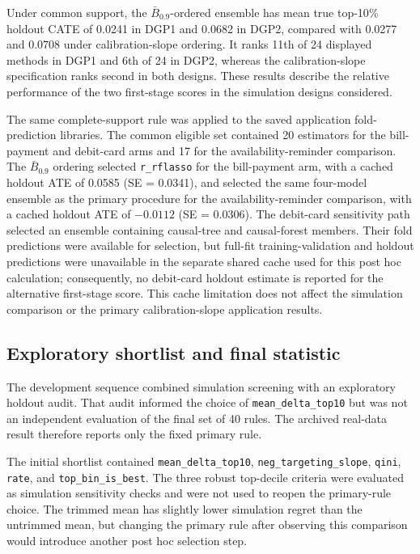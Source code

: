 \documentclass[12pt]{article}
\newcommand{\TargetFrac}{10{\%}\xspace}
\begin{document}


Under common support, the $\bar B_{0.9}$-ordered ensemble has mean true top-\TargetFrac holdout CATE of 0.0241 in DGP1 and 0.0682 in DGP2, compared with 0.0277 and 0.0708 under calibration-slope ordering. It ranks 11th of 24 displayed methods in DGP1 and 6th of 24 in DGP2, whereas the calibration-slope specification ranks second in both designs. These results describe the relative performance of the two first-stage scores in the simulation designs considered.

The same complete-support rule was applied to the saved application fold-prediction libraries. The common eligible set contained 20 estimators for the bill-payment and debit-card arms and 17 for the availability-reminder comparison. The $\bar B_{0.9}$ ordering selected \texttt{r\_rflasso} for the bill-payment arm, with a cached holdout ATE of 0.0585 (SE = 0.0341), and selected the same four-model ensemble as the primary procedure for the availability-reminder comparison, with a cached holdout ATE of $-0.0112$ (SE = 0.0306). The debit-card sensitivity path selected an ensemble containing causal-tree and causal-forest members. Their fold predictions were available for selection, but full-fit training-validation and holdout predictions were unavailable in the separate shared cache used for this post hoc calculation; consequently, no debit-card holdout estimate is reported for the alternative first-stage score. This cache limitation does not affect the simulation comparison or the primary calibration-slope application results.





\subsection{Exploratory shortlist and final statistic}
\label{supp:screening}

The development sequence combined simulation screening with an exploratory holdout audit. That audit informed the choice of \texttt{mean\_delta\_top10} but was not an independent evaluation of the final set of 40 rules. The archived real-data result therefore reports only the fixed primary rule.

The initial shortlist contained \texttt{mean\_delta\_top10}, \texttt{neg\_targeting\_slope}, \texttt{qini}, \texttt{rate}, and \texttt{top\_bin\_is\_best}. The three robust top-decile criteria were evaluated as simulation sensitivity checks and were not used to reopen the primary-rule choice. The trimmed mean has slightly lower simulation regret than the untrimmed mean, but changing the primary rule after observing this comparison would introduce another post hoc selection step.
\end{document}
